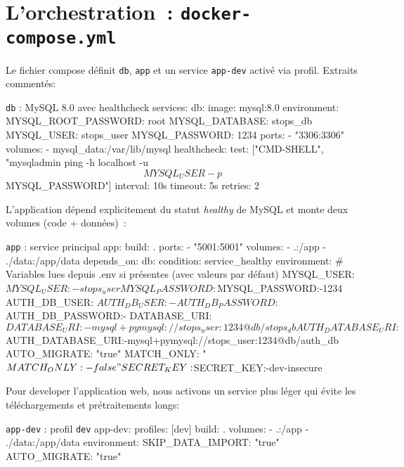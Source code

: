 \section{L'orchestration : \texttt{docker-compose.yml}}

Le fichier compose définit \texttt{db}, \texttt{app} et un service \texttt{app-dev} activé via profil. Extraits commentés:

\begin{codebox}{\texttt{db} : MySQL 8.0 avec healthcheck}
services:
  db:
    image: mysql:8.0
    environment:
      MYSQL_ROOT_PASSWORD: root
      MYSQL_DATABASE: stops_db
      MYSQL_USER: stops_user
      MYSQL_PASSWORD: 1234
    ports:
      - "3306:3306"
    volumes:
      - mysql_data:/var/lib/mysql
    healthcheck:
      test: ["CMD-SHELL", "mysqladmin ping -h localhost -u$${MYSQL_USER} -p$${MYSQL_PASSWORD}"]
      interval: 10s
      timeout: 5s
      retries: 2
\end{codebox}

\noindent L'application dépend explicitement du statut \textit{healthy} de MySQL et monte deux volumes (code + données) :

\begin{codebox}{\texttt{app} : service principal}
  app:
    build: .
    ports:
      - "5001:5001"
    volumes:
      - .:/app
      - ./data:/app/data
    depends_on:
      db:
        condition: service_healthy
    environment:
      # Variables lues depuis .env si présentes (avec valeurs par défaut)
      MYSQL_USER: ${MYSQL_USER:-stops_user}
      MYSQL_PASSWORD: ${MYSQL_PASSWORD:-1234}
      AUTH_DB_USER: ${AUTH_DB_USER:-}
      AUTH_DB_PASSWORD: ${AUTH_DB_PASSWORD:-}
      DATABASE_URI: ${DATABASE_URI:-mysql+pymysql://stops_user:1234@db/stops_db}
      AUTH_DATABASE_URI: ${AUTH_DATABASE_URI:-mysql+pymysql://stops_user:1234@db/auth_db}
      AUTO_MIGRATE: "true"
      MATCH_ONLY: "${MATCH_ONLY:-false}"
      SECRET_KEY: ${SECRET_KEY:-dev-insecure}
\end{codebox}

\noindent Pour developer l'application web, nous activons un service plus léger qui évite les téléchargements et prétraitements longs:

\begin{codebox}{\texttt{app-dev} : profil \texttt{dev}}
  app-dev:
    profiles: [dev]
    build: .
    volumes:
      - .:/app
      - ./data:/app/data
    environment:
      SKIP_DATA_IMPORT: "true"
      AUTO_MIGRATE: "true"
\end{codebox}

